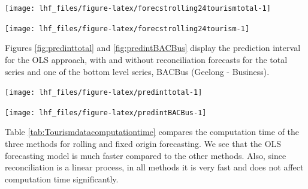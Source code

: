 \documentclass[11pt,a4paper,]{article}
\let\origfigure\figure
\let\endorigfigure\endfigure
\renewenvironment{figure}[1][2] {
    \expandafter\origfigure\expandafter[!htbp]
} {
    \endorigfigure
}
\begin{document}
\begin{figure}

{\centering \texttt{[image: lhf\_files/figure-latex/forecstrolling24tourismtotal-1]} 

}

\caption{The actual test set for the 'Total series' compared to the forecasts from reconciled and unreconciled ETS, ARIMA and OLS methods for rolling and fixed origin tourism demand.}\label{fig:forecstrolling24tourismtotal}
\end{figure}

\begin{figure}

{\centering \texttt{[image: lhf\_files/figure-latex/forecstrolling24tourism-1]} 

}

\caption{The actual test set for the 'BACBus' bottom level series compared to the forecasts from reconciled and unreconciled ETS, ARIMA and OLS methods for rolling and fixed origin tourism demand.}\label{fig:forecstrolling24tourism}
\end{figure}

Figures \ref{fig:predinttotal} and \ref{fig:predintBACBus} display the prediction interval for the OLS approach, with and without reconciliation forecasts for the total series and one of the bottom level series, BACBus (Geelong - Business).

\begin{figure}

{\centering \texttt{[image: lhf\_files/figure-latex/predinttotal-1]} 

}

\caption{The actual test set for the 'Total series' compared to the forecasts from reconciled and unreconciled OLS methods with prediction interval for rolling and fixed origin tourism demand.}\label{fig:predinttotal}
\end{figure}

\begin{figure}

{\centering \texttt{[image: lhf\_files/figure-latex/predintBACBus-1]} 

}

\caption{The actual test set for the 'BACBus' bottom level series compared to the forecasts from reconciled and unreconciled OLS methods with prediction interval for rolling and fixed origin tourism demand.}\label{fig:predintBACBus}
\end{figure}

Table \ref{tab:Tourismdatacomputationtime} compares the computation time of the three methods for rolling and fixed origin forecasting. We see that the OLS forecasting model is much faster compared to the other methods. Also, since reconciliation is a linear process, in all methods it is very fast and does not affect computation time significantly.
\end{document}
